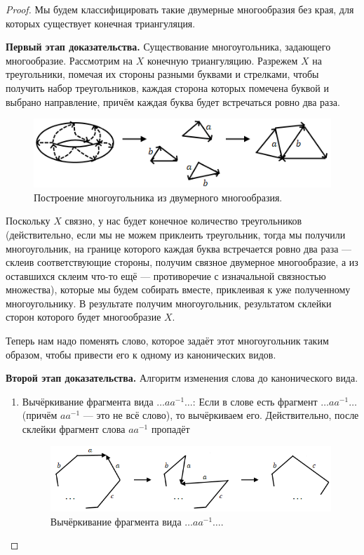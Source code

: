 \begin{proof}
    Мы будем классифицировать такие двумерные многообразия без края, для которых существует конечная триангуляция.
    
    \textbf{Первый этап доказательства.} Существование многоугольника, задающего многообразие.
    Рассмотрим на $X$ конечную триангуляцию. Разрежем $X$ на треугольники, помечая их стороны разными буквами и стрелками, чтобы получить набор треугольников, каждая сторона которых помечена буквой и выбрано направление, причём каждая буква будет встречаться ровно два раза.

    \begin{figure}[ht]
        \centering
        \includegraphics[scale=1]{images/c10.3.png}
        \caption{Построение многоугольника из двумерного многообразия.}
        \label{fig:c10.3}
    \end{figure}

    Поскольку $X$ связно, у нас будет конечное количество треугольников (действительно, если мы не можем приклеить треугольник, тогда мы получили многоугольник, на границе которого каждая буква встречается ровно два раза — склеив соответствующие стороны, получим связное двумерное многообразие, а из оставшихся склеим что-то ещё — противоречие с изначальной связностью множества), которые мы будем собирать вместе, приклеивая к уже полученному многоугольнику. В результате получим многоугольник, результатом склейки сторон которого будет многообразие $X$.

    Теперь нам надо поменять слово, которое задаёт этот многоугольник таким образом, чтобы привести его к одному из канонических видов.

    \textbf{Второй этап доказательства.} Алгоритм изменения слова до канонического вида.
    \begin{enumerate}
        \item Вычёркивание фрагмента вида $\dots a a^{-1} \dots$:
        Если в слове есть фрагмент $\dots a a^{-1} \dots$ (причём $a a^{-1}$ — это не всё слово), то вычёркиваем его. Действительно, после склейки фрагмент слова $aa^{-1}$ пропадёт 

        \begin{figure}[ht]
            \centering
            \includegraphics[scale=0.7]{images/c10.4.png}
            \caption{Вычёркивание фрагмента вида $\dots a a^{-1} \dots$.}
            \label{fig:c10.4}
        \end{figure}


\end{enumerate}
\end{proof}

